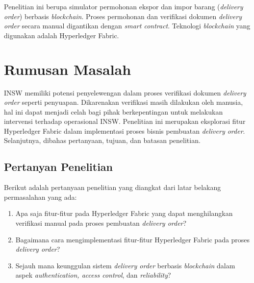 Penelitian ini berupa simulator permohonan ekspor dan impor barang (\textit{delivery order}) berbasis \textit{blockchain}. Proses permohonan dan verifikasi dokumen \textit{delivery order} secara manual digantikan dengan \textit{smart contract}. Teknologi \textit{blockchain} yang digunakan adalah Hyperledger Fabric. 



\section{Rumusan Masalah}
\label{sec:masalah}

INSW memiliki potensi penyelewengan dalam proses verifikasi dokumen \textit{delivery order} seperti penyuapan. Dikarenakan verifikasi masih dilakukan oleh manusia, hal ini dapat menjadi celah bagi pihak berkepentingan untuk melakukan intervensi terhadap operasional INSW. Penelitian ini merupakan eksplorasi fitur Hyperledger Fabric dalam implementasi proses bisnis pembuatan \textit{delivery order}. Selanjutnya, dibahas pertanyaan, tujuan, dan batasan penelitian.


\subsection{Pertanyan Penelitian}
\label{sec:pertanyaanPenelitian}
Berikut adalah pertanyaan penelitian yang diangkat dari latar belakang permasalahan yang ada:
\begin{enumerate}

	\item Apa saja fitur-fitur pada Hyperledger Fabric yang dapat menghilangkan verifikasi manual pada proses pembuatan \textit{delivery order}?
	\item Bagaimana cara mengimplementasi fitur-fitur Hyperledger Fabric pada proses \textit{delivery order}?
	\item Sejauh mana keunggulan sistem \textit{delivery order} berbasis \textit{blockchain} dalam aspek \textit{authentication, access control}, dan \textit{reliability}?
\end{enumerate}

